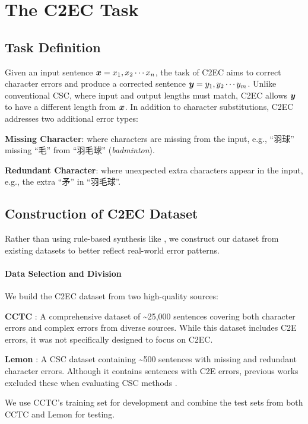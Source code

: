 \section{The C2EC Task}
\label{sec:gcsc_benchmark}

\subsection{Task Definition}
Given an input sentence ${\boldsymbol{x}} = x_1,x_2\cdots{}x_n$, the task of C2EC aims to correct character errors and produce a corrected sentence ${\boldsymbol{y}} = y_1,y_2\cdots{}y_m$. Unlike conventional CSC, where input and output lengths must match, C2EC allows ${\boldsymbol{y}}$ to have a different length from ${\boldsymbol{x}}$. In addition to character substitutions, C2EC addresses two additional error types:
\begin{inparaenum}[\itshape a)]
    \item \textbf{Missing Character}: where characters are missing from the input, e.g., ``羽球'' missing ``毛'' from ``羽毛球'' (\textit{badminton}).
    \item \textbf{Redundant Character}: where unexpected extra characters appear in the input, e.g., the extra ``矛'' in ``羽毛球''.
\end{inparaenum}

\subsection{Construction of C2EC Dataset}
Rather than using rule-based synthesis like \citet{he-etal-2023-umrspell}, we construct our dataset from existing datasets to better reflect real-world error patterns.

\paragraph{Data Selection and Division}
We build the C2EC dataset from two high-quality sources:
\begin{inparaenum}[\itshape a)]
    \item \textbf{CCTC} \cite{wang-etal-2022-cctc}: A comprehensive dataset of \textasciitilde{}25,000 sentences covering both character errors and complex errors from diverse sources. While this dataset includes C2E errors, it was not specifically designed to focus on C2EC.
    \item \textbf{Lemon} \cite{wu-etal-2023-rethinking}: A CSC dataset containing \textasciitilde{}500 sentences with missing and redundant character errors. Although it contains sentences with C2E errors, previous works excluded these when evaluating CSC methods \cite{wu-etal-2023-rethinking,liu-etal-2023-chinese,zhou-etal-2024-simple,li-etal-2024-cllm}.
\end{inparaenum}
We use CCTC's training set for development and combine the test sets from both CCTC and Lemon for testing.

